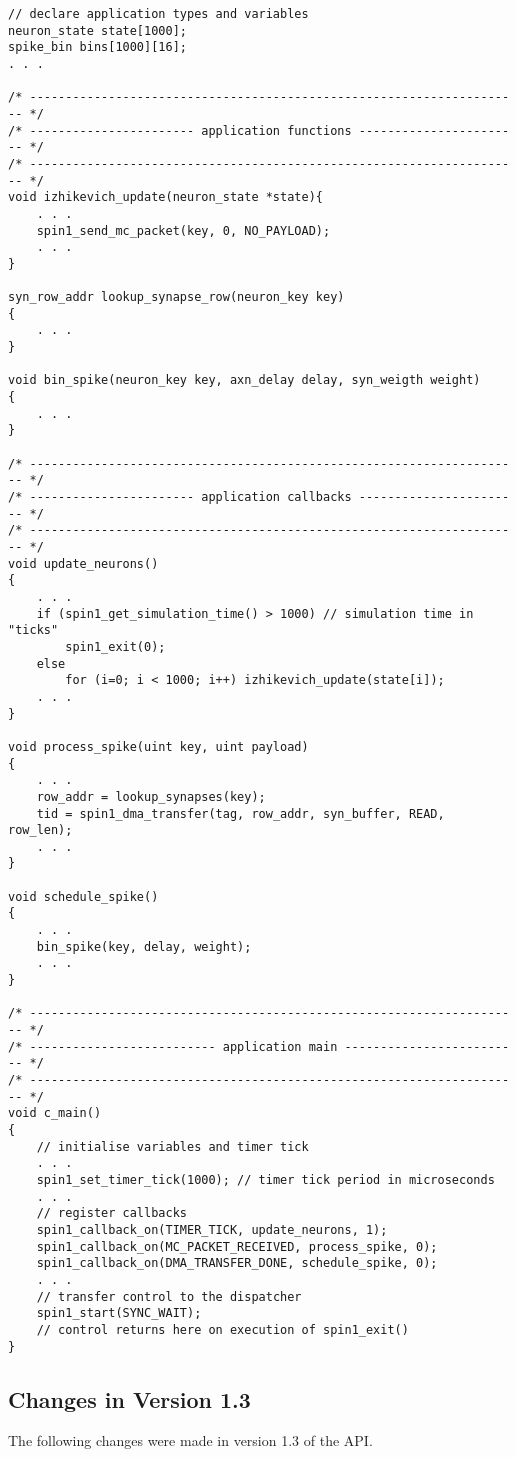 \documentclass[11pt,a4paper,twoside]{article}
\begin{document}
\begin{lstlisting}
// declare application types and variables
neuron_state state[1000];
spike_bin bins[1000][16];
. . .

/* --------------------------------------------------------------------- */
/* ----------------------- application functions ----------------------- */
/* --------------------------------------------------------------------- */
void izhikevich_update(neuron_state *state){
	. . .
	spin1_send_mc_packet(key, 0, NO_PAYLOAD);
	. . .
}

syn_row_addr lookup_synapse_row(neuron_key key)
{
	. . .
}

void bin_spike(neuron_key key, axn_delay delay, syn_weigth weight)
{
	. . .
}

/* --------------------------------------------------------------------- */
/* ----------------------- application callbacks ----------------------- */
/* --------------------------------------------------------------------- */
void update_neurons()
{
	. . .
	if (spin1_get_simulation_time() > 1000) // simulation time in "ticks"
		spin1_exit(0);
	else
		for (i=0; i < 1000; i++) izhikevich_update(state[i]);
	. . .
}

void process_spike(uint key, uint payload)
{
	. . .
	row_addr = lookup_synapses(key);
	tid = spin1_dma_transfer(tag, row_addr, syn_buffer, READ, row_len);
	. . .
}

void schedule_spike()
{
	. . . 
	bin_spike(key, delay, weight);
	. . . 
}

/* --------------------------------------------------------------------- */
/* -------------------------- application main ------------------------- */
/* --------------------------------------------------------------------- */
void c_main()
{
	// initialise variables and timer tick 
	. . .
	spin1_set_timer_tick(1000); // timer tick period in microseconds
	. . .
	// register callbacks
	spin1_callback_on(TIMER_TICK, update_neurons, 1);
	spin1_callback_on(MC_PACKET_RECEIVED, process_spike, 0);
	spin1_callback_on(DMA_TRANSFER_DONE, schedule_spike, 0);
	. . .
	// transfer control to the dispatcher
	spin1_start(SYNC_WAIT);
	// control returns here on execution of spin1_exit()
}
\end{lstlisting}

\subsection{Changes in Version 1.3}

The following changes were made in version 1.3 of the API.
\end{document}
